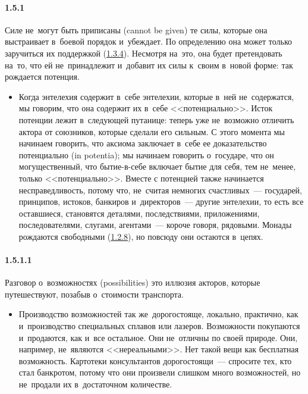 \paragraph{1.5.1}\hypertarget{par:1.5.1}{} Силе не~могут быть приписаны (cannot be given) те силы, которые она выстраивает в~боевой порядок и~убеждает. По определению она может только заручиться их поддержкой (\hyperlink{par:1.3.4}{1.3.4}). Несмотря на~это, она будет претендовать на~то, что ей не~принадлежит и~добавит их силы к~своим в~новой форме: так рождается потенция.
	\begin{itemize}
	\item Когда энтелехия содержит в~себе энтелехии, которые в~ней не~содержатся, мы говорим, что она содержит их в~себе <<потенциально>>. Исток потенции лежит в~следующей путанице: теперь уже не~возможно отличить актора от союзников, которые сделали его сильным. С этого момента мы начинаем говорить, что аксиома заключает в~себе ее доказательство потенциально (in potentia); мы начинаем говорить о~государе, что он могущественный, что бытие-в-себе включает бытие для себя, тем не~менее, только <<потенциально>>. Вместе с потенцией также начинается несправедливость, потому что, не~считая немногих счастливых~--- государей, принципов, истоков, банкиров и~директоров~--- другие энтелехии, то есть все оставшиеся, становятся деталями, последствиями, приложениями, последователями, слугами, агентами~--- короче говоря, рядовыми. Монады рождаются свободными (\hyperlink{par:1.2.8}{1.2.8}), но повсюду они остаются в~цепях.
	\end{itemize}

\paragraph{1.5.1.1}\hypertarget{par:1.5.1.1}{} Разговор о~возможностях (possibilities) это иллюзия акторов, которые путешествуют, позабыв о~стоимости транспорта.
	\begin{itemize}
	\item Производство возможностей так же~дорогостояще, локально, практично, как и~производство специальных сплавов или лазеров. Возможности покупаются и~продаются, как и~все остальное. Они не~отличны по своей природе. Они, например, не~являются <<нереальными>>. Нет такой вещи как бесплатная возможность. Картотеки консультантов дорогостоящи~--- спросите тех, кто стал банкротом, потому что они произвели слишком много возможностей, но не~продали их в~достаточном количестве.
	\end{itemize}

